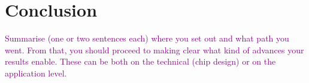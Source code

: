 \chapter{Conclusion}
\label{ch:conclusion}
\textcolor{purple}{Summarise (one or two sentences each) where you set out and what path you went. From that, you should proceed to making clear what kind of advances your results enable. These can be both on the technical (chip design) or on the application level.}
